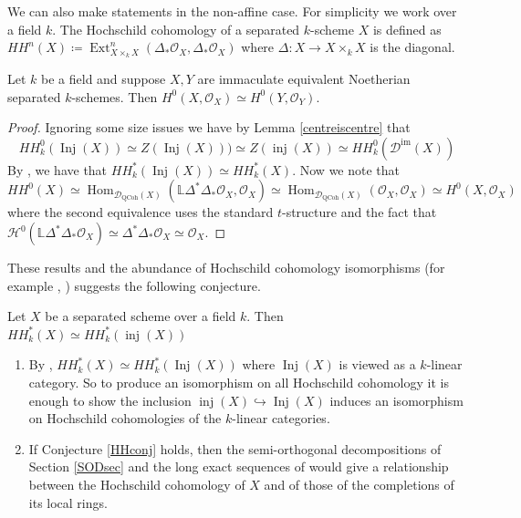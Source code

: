 \documentclass[12pt,oneside]{amsart}
\DeclareMathOperator*{\Inj}{Inj}
\DeclareMathOperator{\Hom}{Hom}
\DeclareMathOperator{\QCoh}{QCoh}
\DeclareMathOperator{\Ext}{Ext}
\DeclareMathOperator{\inj}{inj}
\DeclareMathOperator{\immac}{im}
\begin{document}
\begin{remark}
We can also make statements in the non-affine case. For simplicity we work over a field $k$. The Hochschild cohomology of a separated $k$-scheme $X$ is defined as $HH^n(X) \coloneq \Ext^n_{X \times_k X}(\Delta_* \mathcal{O}_X,\Delta_*\mathcal{O}_X)$ where $\Delta: X \to X \times_k X$ is the diagonal. 
\end{remark}

\begin{theorem} \label{H^0invariant} Let $k$ be a field and suppose $X, Y$ are immaculate equivalent Noetherian separated $k$-schemes. Then $H^0(X,\mathcal{O}_X) \simeq H^0(Y,\mathcal{O}_Y)$. 
\end{theorem}

\begin{proof}
Ignoring some size issues we have by Lemma  \ref{centreiscentre}  that
\[
HH^0_k(\Inj(X)) \simeq Z(\Inj(X))) \simeq Z(\inj(X)) \simeq HH^0_k(\mathcal{D}^{\immac}(X))
\]
By \cite[Corollary 7.8.2]{LVdB05}, we have that $HH^\ast_k(\Inj(X)) \simeq HH^\ast_k(X)$. Now we note that
\[
HH^0(X) \simeq \Hom_{\mathcal{D}_{\QCoh}(X)}(\mathbb{L} \Delta^\ast \Delta_\ast \mathcal{O}_X, \mathcal{O}_X) \simeq \Hom_{\mathcal{D}_{\QCoh}(X)}(\mathcal{O}_X, \mathcal{O}_X) \simeq H^0(X,\mathcal{O}_X)
\]
where the second equivalence uses the standard $t$-structure and the fact that $\mathcal{H}^0(\mathbb{L} \Delta^\ast \Delta_\ast \mathcal{O}_X) \simeq \Delta^\ast \Delta_\ast \mathcal{O}_X \simeq \mathcal{O}_X$. 
\end{proof}

These results and the abundance of Hochschild cohomology isomorphisms (for example \cite[Theorem 4.4.1]{LVdB05}, \cite[Proposition 2.4]{kel19}) suggests the following conjecture. 

\begin{conj} \label{HHconj}
Let $X$ be a separated scheme over a field $k$. Then $HH_k^\ast(X) \simeq HH^\ast_k(\inj(X))$
\end{conj}

\begin{remark}
\begin{enumerate}
\item By \cite[Corollary 7.8.2]{LVdB05},  $HH_k^\ast(X) \simeq HH^\ast_k(\Inj(X))$ where $\Inj(X)$ is viewed as a $k$-linear category. So to produce an isomorphism on all Hochschild cohomology it is enough to show the inclusion $\inj(X) \hookrightarrow \Inj(X)$ induces an isomorphism on Hochschild cohomologies of the $k$-linear categories.

\item If Conjecture \ref{HHconj} holds, then the semi-orthogonal decompositions of Section \ref{SODsec} and the long exact sequences of \cite[Section 4.5]{kel03} would give a relationship between the Hochschild cohomology of $X$ and of those of the completions of its local rings. 

\end{enumerate} 
\end{remark}
\end{document}
